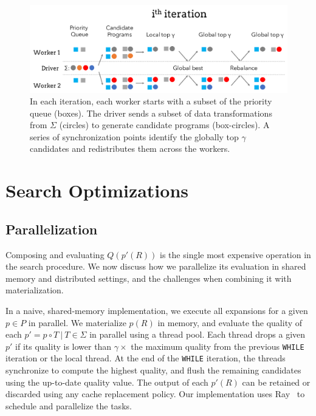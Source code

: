 \begin{figure}[h]
    \centering
    \includegraphics[width=\columnwidth]{figures/distributed.pdf}
    \vspace{1pt}
    \caption{In each iteration, each worker starts with a subset of the priority queue (boxes).  The driver sends a subset of data transformations from $\Sigma$ (circles) to generate candidate programs (box-circles).  A series of synchronization points identify the globally top $\gamma$ candidates and redistributes them across the workers.   \label{fig:algo}}
\end{figure}

\section{Search Optimizations}\label{s:opts}

\subsection{Parallelization}\label{s:parallel}
Composing and evaluating $Q(p'(R))$ is the single most expensive operation in the search procedure.   We now discuss how we parallelize its evaluation in shared memory and distributed settings, and the challenges when combining it with materialization.

 In a naive, shared-memory implementation, we execute all expansions for a given $p\in P$ in parallel.  We materialize $p(R)$ in memory, and evaluate the quality of each $p' = p\circ T\ |\ T \in \Sigma$ in parallel using a  thread pool.  Each thread drops a given $p'$ if its quality is lower than $\gamma\times$ the maximum quality from the previous \texttt{WHILE} iteration or the local thread.  At the end of the \texttt{WHILE} iteration, the threads synchronize to compute the highest quality, and flush the remaining candidates using the up-to-date quality value.  The output of each $p'(R)$ can be retained or discarded using any cache replacement policy.  Our implementation uses Ray~\cite{ray} to schedule and parallelize the tasks.

